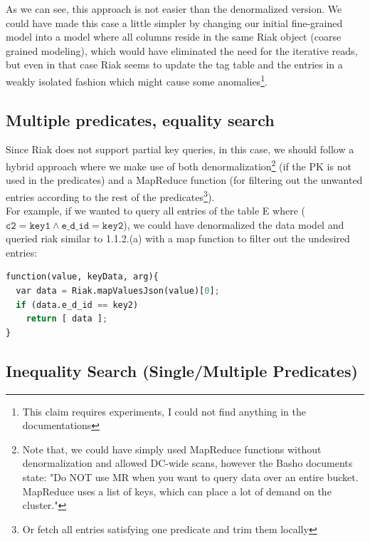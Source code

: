 \documentclass[12pt]{article}
\begin{document}
\begin{enumerate}
As we can see, this approach is not easier than the denormalized
version. We could have made this case a little simpler by changing our
initial fine-grained model into a model where all columns reside in the
same Riak object (coarse grained modeling), which would have eliminated
the need for the iterative reads, but even in that case Riak seems
to update the tag table and the entries in a weakly isolated fashion
which might cause some anomalies\footnote{This claim requires experiments, 
I could not find anything in the documentations}.

\end{enumerate}

\subsection{Multiple predicates, equality search}
Since Riak does not support partial key queries, in this case, we should follow a hybrid approach where we make use of
both denormalization\footnote{Note that, we could have simply used MapReduce
functions without denormalization and allowed DC-wide scans, however the Basho documents state:
"Do NOT use MR when you want to query data over an entire bucket. MapReduce uses a
list of keys, which can place a lot of demand on the cluster."} (if the PK is not used in the predicates) and a
MapReduce function (for filtering out the unwanted entries according to
the rest of the predicates\footnote{Or fetch all entries
satisfying one predicate and trim them locally}). 
\\ For example, if we wanted to query all entries of the table E where 
($\mathtt{c2=key1} \wedge \mathtt{e\_d\_id=key2}$), we could have denormalized the data model and queried riak similar
to
1.1.2.(a) with a map function to filter out the undesired entries: 

\begin{lstlisting}[language=Python,basicstyle=\small,backgroundcolor =
\color{lightgray}]
function(value, keyData, arg){
  var data = Riak.mapValuesJson(value)[0];
  if (data.e_d_id == key2)
    return [ data ]; 
}
\end{lstlisting}

\subsection{Inequality Search (Single/Multiple Predicates)}
\end{document}

